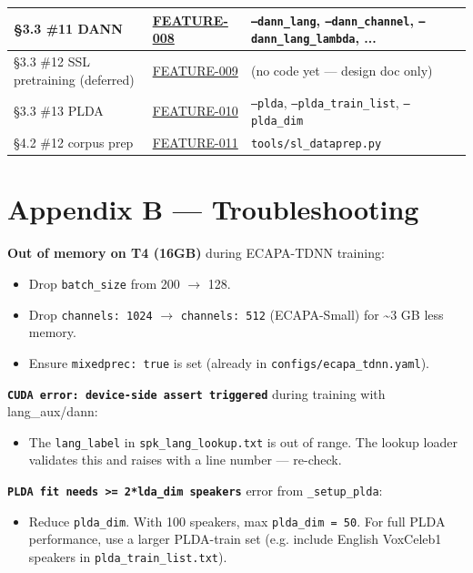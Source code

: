 \documentclass[10pt,a4paper]{article}
\begin{document}
\begin{center}
\begin{tabularx}{\textwidth}{|Y|Y|Y|}
\hline
§3.3 \#11 DANN & \href{docs/bugfixes/FEATURE-008-dann-adversarial.md}{FEATURE-008} & \texttt{--dann\_lang}, \texttt{--dann\_channel}, \texttt{--dann\_lang\_lambda}, ... \\
\hline
§3.3 \#12 SSL pretraining (deferred) & \href{docs/bugfixes/FEATURE-009-ssl-pretraining.md}{FEATURE-009} & (no code yet --- design doc only) \\
\hline
§3.3 \#13 PLDA & \href{docs/bugfixes/FEATURE-010-plda-scoring.md}{FEATURE-010} & \texttt{--plda}, \texttt{--plda\_train\_list}, \texttt{--plda\_dim} \\
\hline
§4.2 \#12 corpus prep & \href{docs/bugfixes/FEATURE-011-sl-dataprep.md}{FEATURE-011} & \texttt{tools/sl\_dataprep.py} \\
\hline
\end{tabularx}
\end{center}

\section*{Appendix B --- Troubleshooting}

\textbf{Out of memory on T4 (16GB)} during ECAPA-TDNN training:
\begin{itemize}[leftmargin=*,itemsep=2pt]
  \item Drop \texttt{batch\_size} from 200 $\rightarrow$ 128.
  \item Drop \texttt{channels: 1024} $\rightarrow$ \texttt{channels: 512} (ECAPA-Small) for \textasciitilde{}3 GB less memory.
  \item Ensure \texttt{mixedprec: true} is set (already in \texttt{configs/ecapa\_tdnn.yaml}).
\end{itemize}

\textbf{\texttt{CUDA error: device-side assert triggered}} during training with lang\_aux/dann:
\begin{itemize}[leftmargin=*,itemsep=2pt]
  \item The \texttt{lang\_label} in \texttt{spk\_lang\_lookup.txt} is out of range. The lookup loader validates this and raises with a line number --- re-check.
\end{itemize}

\textbf{\texttt{PLDA fit needs >= 2*lda\_dim speakers}} error from \texttt{\_setup\_plda}:
\begin{itemize}[leftmargin=*,itemsep=2pt]
  \item Reduce \texttt{plda\_dim}. With 100 speakers, max \texttt{plda\_dim = 50}. For full PLDA performance, use a larger PLDA-train set (e.g. include English VoxCeleb1 speakers in \texttt{plda\_train\_list.txt}).
\end{itemize}
\end{document}
